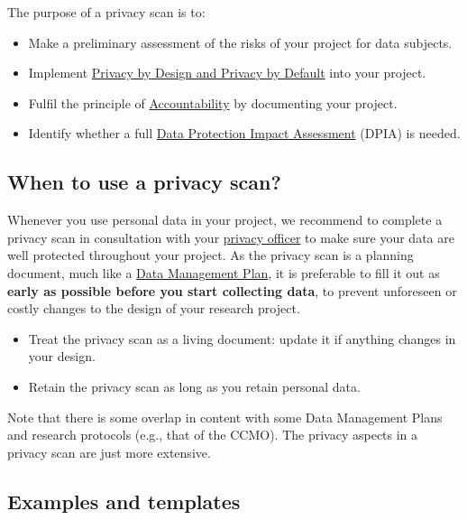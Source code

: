 \documentclass[
]{book}
\providecommand{\tightlist}{%
  \setlength{\itemsep}{0pt}\setlength{\parskip}{0pt}}
\begin{document}
The purpose of a privacy scan is to:

\begin{itemize}
\tightlist
\item
  Make a preliminary assessment of the risks of your project for data subjects.\\
\item
  Implement \protect\hyperlink{privacy-by-design}{Privacy by Design and Privacy by Default} into
  your project.
\item
  Fulfil the principle of \protect\hyperlink{accountability}{Accountability} by documenting your
  project.
\item
  Identify whether a full \protect\hyperlink{dpia}{Data Protection Impact Assessment} (DPIA) is needed.
\end{itemize}

\hypertarget{privacy-scan-when}{%
\subsection{When to use a privacy scan?}\label{privacy-scan-when}}

Whenever you use personal data in your project, we recommend to complete a
privacy scan in consultation with your \protect\hyperlink{support}{privacy officer}
to make sure your data are well protected throughout your project. As the
privacy scan is a planning document, much like a
\href{https://www.uu.nl/en/research/research-data-management/guides/data-management-planning}{Data Management Plan},
it is preferable to fill it out as \textbf{early as possible before you start
collecting data}, to prevent unforeseen or costly changes to the design of your
research project.

\begin{itemize}
\tightlist
\item
  Treat the privacy scan as a living document: update it if anything changes
  in your design.\\
\item
  Retain the privacy scan as long as you retain personal data.
\end{itemize}

Note that there is some overlap in content with some Data Management Plans and
research protocols (e.g., that of the CCMO). The privacy aspects in a privacy
scan are just more extensive.

\hypertarget{examples-and-templates-1}{%
\subsection{Examples and templates}\label{examples-and-templates-1}}
\end{document}
